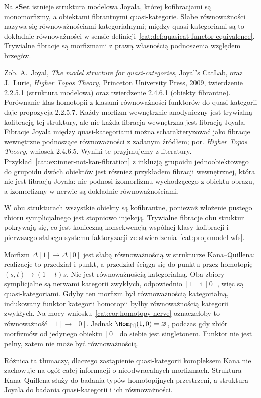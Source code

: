 \begin{twierdzenie}\label{cat:thm:joyal-model}
Na $\mathbf{sSet}$ istnieje struktura modelowa Joyala, której kofibracjami są monomorfizmy, a obiektami fibrantnymi quasi-kategorie. Słabe równoważności nazywa się równoważnościami kategorialnymi; między quasi-kategoriami są to dokładnie równoważności w sensie definicji~\ref{cat:def:quasicat-functor-equivalence}. Trywialne fibracje są morfizmami z prawą własnością podnoszenia względem brzegów.
\end{twierdzenie}
Zob. A.~Joyal, \emph{The model structure for quasi-categories}, Joyal's CatLab, oraz J.~Lurie, \emph{Higher Topos Theory}, Princeton University Press, 2009, twierdzenie 2.2.5.1 (struktura modelowa) oraz twierdzenie 2.4.6.1 (obiekty fibrantne). Porównanie klas homotopii z klasami równoważności funktorów do quasi-kategorii daje propozycja 2.2.5.7. Każdy morfizm wewnętrznie anodyniczny jest trywialną kofibracją tej struktury, ale nie każda fibracja wewnętrzna jest fibracją Joyala. Fibracje Joyala między quasi-kategoriami można scharakteryzować jako fibracje wewnętrzne podnoszące równoważności z zadanym źródłem; por. \emph{Higher Topos Theory}, wniosek 2.4.6.5. Wyniki te przyjmujemy z literatury. Przykład~\ref{cat:ex:inner-not-kan-fibration} z inkluzją grupoidu jednoobiektowego do grupoidu dwóch obiektów jest również przykładem fibracji wewnętrznej, która nie jest fibracją Joyala: nie podnosi izomorfizmu wychodzącego z obiektu obrazu, a izomorfizmy w nerwie są dokładnie równoważnościami.

W obu strukturach wszystkie obiekty są kofibrantne, ponieważ włożenie pustego zbioru symplicjalnego jest stopniowo injekcją. Trywialne fibracje obu struktur pokrywają się, co jest konieczną konsekwencją wspólnej klasy kofibracji i pierwszego słabego systemu faktoryzacji ze stwierdzenia~\ref{cat:prop:model-wfs}.

\begin{przyklad}\label{cat:ex:kan-joyal-difference}
Morfizm $\Delta[1]\to\Delta[0]$ jest słabą równoważnością w strukturze Kana--Quillena: realizacje to przedział i punkt, a przedział ściąga się do punktu przez homotopię $(s,t)\mapsto(1-t)s$. Nie jest równoważnością kategorialną. Oba zbiory symplicjalne są nerwami kategorii zwykłych, odpowiednio $[1]$ i $[0]$, więc są quasi-kategoriami. Gdyby ten morfizm był równoważnością kategorialną, indukowany funktor kategorii homotopii byłby równoważnością kategorii zwykłych. Na mocy wniosku~\ref{cat:cor:homotopy-nerve} oznaczałoby to równoważność $[1]\to[0]$. Jednak $\Hom_{[1]}(1,0)=\varnothing$, podczas gdy zbiór morfizmów od jedynego obiektu $[0]$ do siebie jest singletonem. Funktor nie jest pełny, zatem nie może być równoważnością.
\end{przyklad}
Różnica ta tłumaczy, dlaczego zastąpienie quasi-kategorii kompleksem Kana nie zachowuje na ogół całej informacji o nieodwracalnych morfizmach. Struktura Kana--Quillena służy do badania typów homotopijnych przestrzeni, a struktura Joyala do badania quasi-kategorii i ich równoważności.
